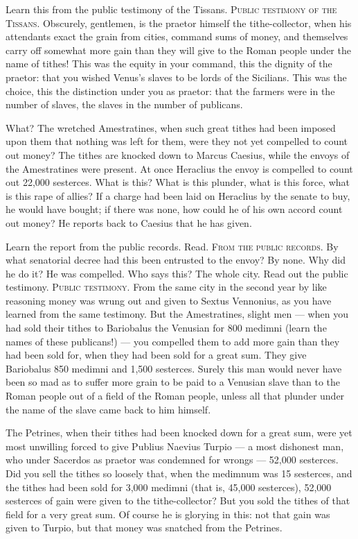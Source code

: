  Learn this from the public testimony of the Tissans. \textsc{Public testimony of the Tissans}. Obscurely, gentlemen, is the praetor himself the tithe-collector, when his attendants exact the grain from cities, command sums of money, and themselves carry off somewhat more gain than they will give to the Roman people under the name of tithes! This was the equity in your command, this the dignity of the praetor: that you wished Venus's slaves to be lords of the Sicilians. This was the choice, this the distinction under you as praetor: that the farmers were in the number of slaves, the slaves in the number of publicans.

 What? The wretched Amestratines, when such great tithes had been imposed upon them that nothing was left for them, were they not yet compelled to count out money? The tithes are knocked down to Marcus Caesius, while the envoys of the Amestratines were present. At once Heraclius the envoy is compelled to count out 22,000 sesterces. What is this? What is this plunder, what is this force, what is this rape of allies? If a charge had been laid on Heraclius by the senate to buy, he would have bought; if there was none, how could he of his own accord count out money? He reports back to Caesius that he has given.

 Learn the report from the public records. Read. \textsc{From the public records}. By what senatorial decree had this been entrusted to the envoy? By none. Why did he do it? He was compelled. Who says this? The whole city. Read out the public testimony. \textsc{Public testimony}. From the same city in the second year by like reasoning money was wrung out and given to Sextus Vennonius, as you have learned from the same testimony. But the Amestratines, slight men --- when you had sold their tithes to Bariobalus the Venusian for 800 medimni (learn the names of these publicans!) --- you compelled them to add more gain than they had been sold for, when they had been sold for a great sum. They give Bariobalus 850 medimni and 1,500 sesterces. Surely this man would never have been so mad as to suffer more grain to be paid to a Venusian slave than to the Roman people out of a field of the Roman people, unless all that plunder under the name of the slave came back to him himself.

 The Petrines, when their tithes had been knocked down for a great sum, were yet most unwilling forced to give Publius Naevius Turpio --- a most dishonest man, who under Sacerdos as praetor was condemned for wrongs --- 52,000 sesterces. Did you sell the tithes so loosely that, when the medimnum was 15 sesterces, and the tithes had been sold for 3,000 medimni (that is, 45,000 sesterces), 52,000 sesterces of gain were given to the tithe-collector? But you sold the tithes of that field for a very great sum. Of course he is glorying in this: not that gain was given to Turpio, but that money was snatched from the Petrines.

